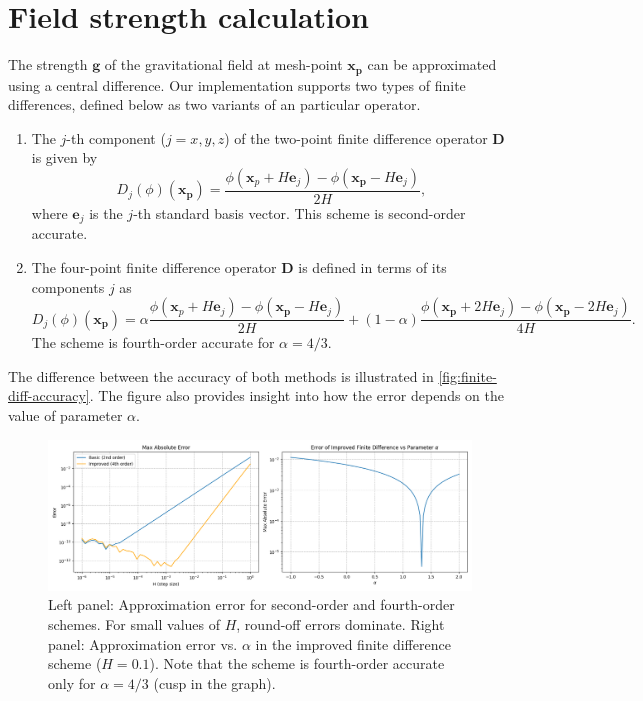 \section{Field strength calculation}
The strength $\mathbf{g}$ of the gravitational field at mesh-point $\mathbf{x}_\mathbf{p}$ can be approximated using a central difference.
Our implementation supports two types of finite differences, defined below as two variants of an particular operator.
\begin{enumerate}
    \item The $j$-th component ($j = x, y, z$) of the two-point finite difference operator $\mathbf{D}$ is given by
          \begin{equation}\label{eq:two-point-central-diff-def-1}
              D_j(\phi)(\mathbf{x}_\mathbf{p}) = \frac{\phi(\mathbf{x}_{p} + H\mathbf{e}_j) - \phi(\mathbf{x}_\mathbf{p} - H\mathbf{e}_j)}{2H},
          \end{equation}
          where $\mathbf{e}_j$ is the $j$-th standard basis vector.
          This scheme is second-order accurate.
    \item The four-point finite difference operator $\mathbf{D}$ is defined in terms of its components $j$ as
          \begin{equation*}
              D_j(\phi)(\mathbf{x}_\mathbf{p}) = \alpha\frac{\phi(\mathbf{x}_{p} + H\mathbf{e}_j) - \phi(\mathbf{x}_\mathbf{p} - H\mathbf{e}_j)}{2H} + (1-\alpha)\frac{\phi(\mathbf{x}_\mathbf{p} + 2H\mathbf{e}_j) - \phi(\mathbf{x}_\mathbf{p} - 2H\mathbf{e}_j)}{4H}.
          \end{equation*}
          The scheme is fourth-order accurate for $\alpha = 4/3$.
\end{enumerate}

The difference between the accuracy of both methods is illustrated in \autoref{fig:finite-diff-accuracy}.
The figure also provides insight into how the error depends on the value of parameter $\alpha$.
\begin{figure}[htp]
    \centering
    \includegraphics[scale=0.43]{chapters/pm-method/img/finite-difference.png}
    \caption{Left panel: Approximation error for second-order and fourth-order schemes.
        For small values of $H$, round-off errors dominate.
        Right panel: Approximation error vs. $\alpha$ in the improved finite difference scheme ($H = 0.1$).
        Note that the scheme is fourth-order accurate only for $\alpha = 4/3$ (cusp in the graph).}
    \label{fig:finite-diff-accuracy}
\end{figure}

